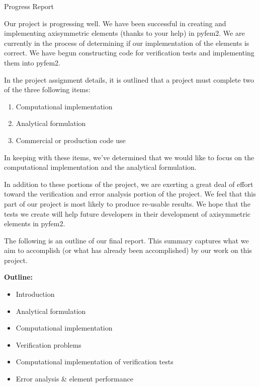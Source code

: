 \documentclass{article}
\begin{document}
\vspace{0.2in}
\huge{Progress Report}\normalsize
\vspace{0.2in}

Our project is progressing well. We have been successful in creating and implementing axisymmetric elements (thanks to your help) in pyfem2. We are currently in the process of determining if our implementation of the elements is correct. We have begun constructing code for verification tests and implementing them into pyfem2. 

In the project assignment details, it is outlined that a project must complete two of the three following items:
\begin{enumerate}
\item Computational implementation
\item Analytical formulation
\item Commercial or production code use
\end{enumerate} 
In keeping with these items, we've determined that we would like to focus on the computational implementation and the analytical formulation. 

In addition to these portions of the project, we are exerting a great deal of effort toward the verification and error analysis portion of the project. We feel that this part of our project is most likely to produce re-usable results. We hope that the tests we create will help future developers in their development of axisymmetric elements in pyfem2.

The following is an outline of our final report. This summary captures what we aim to accomplish (or what has already been accomplished) by our work on this project.

\vspace{0.2in}
\bf{Outline:}\normalfont
\begin{itemize}
\item{Introduction}
\item{Analytical formulation}
\item{Computational implementation}
\item{Verification problems}
\item{Computational implementation of verification tests}
\item{Error analysis \& element performance}
\end{itemize}
\end{document}

